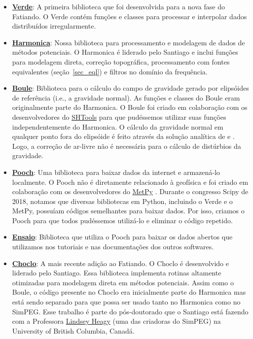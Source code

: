 \documentclass[10pt,a4paper,oneside]{book}
\begin{document}
\begin{itemize}
  \item \href{https://www.fatiando.org/verde}{\textbf{Verde}}:
    A primeira biblioteca que foi desenvolvida para a nova fase do Fatiando. O
    Verde contém funções e classes para processar e interpolar dados
    distribuídos irregularmente.
  \item \href{https://www.fatiando.org/harmonica}{\textbf{Harmonica}}:
    Nossa biblioteca para processamento e modelagem de dados de métodos
    potenciais. O Harmonica é liderado pelo Santiago e inclui funções para
    modelagem direta, correção topográfica, processamento com fontes
    equivalentes (seção~\ref{sec_eql}) e filtros no domínio da frequência.
  \item \href{https://www.fatiando.org/boule}{\textbf{Boule}}:
    Biblioteca para o cálculo do campo de gravidade gerado por elipsóides de
    referência (i.e., a gravidade normal). As funções e classes do Boule eram
    originalmente parte do Harmonica. O Boule foi criado em colaboração com os
    desenvolvedores do \href{https://github.com/SHTOOLS/SHTOOLS}{SHTools}
    \citep{Wieczorek2018} para que pudéssemos utilizar suas funções
    independentemente do Harmonica. O cálculo da gravidade normal em qualquer
    ponto fora do elipsóide é feito através da solução analítica de
    \citet{Lakshmanan1991} e \citet{Li2001}. Logo, a correção de ar-livre não é
    necessária para o cálculo de distúrbios da gravidade.
  \item \href{https://www.fatiando.org/pooch}{\textbf{Pooch}}:
    Uma biblioteca para baixar dados da internet e armazená-lo localmente. O
    Pooch não é diretamente relacionado à geofísica e foi criado em colaboração
    com os desenvolvedores do \href{https://github.com/Unidata/MetPy}{MetPy}
    \citep{May2016}. Durante o congresso Scipy de 2018, notamos que diversas
    bibliotecas em Python, incluindo o Verde e o MetPy, possuíam códigos
    semelhantes para baixar dados.
    Por isso, criamos o Pooch para que todos pudéssemos utilizá-lo e eliminar
    o código repetido.
  \item \href{https://www.fatiando.org/ensaio}{\textbf{Ensaio}}:
    Biblioteca que utiliza o Pooch para baixar os dados abertos que utilizamos
    nos tutoriais e nas documentações dos outros softwares.
  \item \href{https://www.fatiando.org/choclo}{\textbf{Choclo}}:
    A mais recente adição ao Fatiando. O Choclo é desenvolvido e liderado pelo
    Santiago. Essa biblioteca implementa rotinas altamente otimizadas para
    modelagem direta em métodos potenciais. Assim como o Boule, o código
    presente no Choclo era inicialmente parte do Harmonica mas está sendo
    separado para que possa ser usado tanto no Harmonica como no SimPEG. Esse
    trabalho é parte do pós-doutorado que o Santiago está fazendo com a
    Professora \href{https://lindseyjh.ca/}{Lindsey Heagy} (uma das criadoras
    do SimPEG) na University of British Columbia, Canadá.
\end{itemize}
\end{document}
